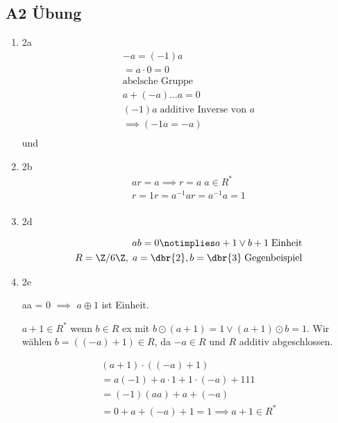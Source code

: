 \subsection*{A2 Übung}

\begin{enumerate}
  \item 2a
    \begin{align*}
      -a = (-1)a \\
      = a\cdot 0 = 0\\
      \text{abelsche Gruppe} \\
      a + (-a) \ldots a = 0 \\
      (-1)a \; \text{additive Inverse von $a$}\\
      \implies (-1 a = -a) \\

    \end{align*}
    und

    \item 2b
    \begin{align*}
      ar = a \implies r = a \; a \in R^{*}\\
      r = 1 r = a^{-1}a r = a^{-1}a = 1\\
    \end{align*}

    \item 2d

    \begin{align*}
      ab = 0 \notimplies a+1 \lor b+1 \; \text{Einheit} \\
      R = \Z / 6 \Z, \; a = \dbr{2}, b = \dbr{3} \; \text{Gegenbeispiel}
    \end{align*}

    \item 2e

    aa = 0 $\implies$ $a \oplus 1$ ist Einheit.

    $a + 1 \in R^{*}$ wenn $b \in R$ ex mit $b \odot (a+1) = 1 \lor (a+1)\odot b = 1 $. Wir wählen $b = ((-a) + 1) \in R$, da $-a \in R$ und $R$ additiv abgeschlossen.

    \begin{align*}
      (a+1)\cdot ((-a) + 1) \\
      = a (-1) + a \cdot 1 + 1 \cdot ( -a) + 1 1 1 \\
      = (-1) (aa) + a + (-a) \\
      = 0 + a + (-a) + 1 = 1 \implies a + 1 \in R^{*}\\
    \end{align*}


\end{enumerate}


